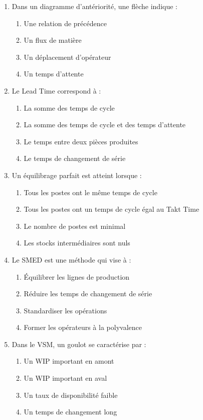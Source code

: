 \documentclass[12pt,a4paper]{article}
\begin{document}
\begin{center}
\begin{enumerate}
    \item Dans un diagramme d'antériorité, une flèche indique :
    \begin{enumerate}
        \item Une relation de précédence
        \item Un flux de matière
        \item Un déplacement d'opérateur
        \item Un temps d'attente
    \end{enumerate}
    
    \item Le Lead Time correspond à :
    \begin{enumerate}
        \item La somme des temps de cycle
        \item La somme des temps de cycle et des temps d'attente
        \item Le temps entre deux pièces produites
        \item Le temps de changement de série
    \end{enumerate}
    
    \item Un équilibrage parfait est atteint lorsque :
    \begin{enumerate}
        \item Tous les postes ont le même temps de cycle
        \item Tous les postes ont un temps de cycle égal au Takt Time
        \item Le nombre de postes est minimal
        \item Les stocks intermédiaires sont nuls
    \end{enumerate}
    
    \item Le SMED est une méthode qui vise à :
    \begin{enumerate}
        \item Équilibrer les lignes de production
        \item Réduire les temps de changement de série
        \item Standardiser les opérations
        \item Former les opérateurs à la polyvalence
    \end{enumerate}
    
    \item Dans le VSM, un goulot se caractérise par :
    \begin{enumerate}
        \item Un WIP important en amont
        \item Un WIP important en aval
        \item Un taux de disponibilité faible
        \item Un temps de changement long
    \end{enumerate}
    

\end{enumerate}
\end{center}
\end{document}
